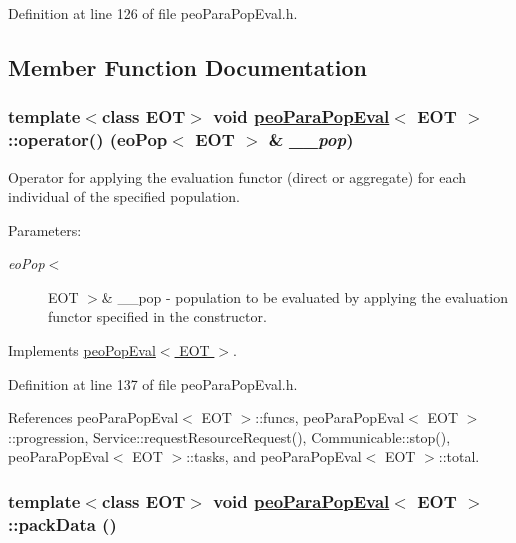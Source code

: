 Definition at line 126 of file peo\-Para\-Pop\-Eval.h.

\subsection{Member Function Documentation}
\hypertarget{classpeoParaPopEval_aeaa4fca4f8650e453e308838b4a2cb5}{
\subsubsection[operator()]{\setlength{\rightskip}{0pt plus 5cm}template$<$class EOT$>$ void \hyperlink{classpeoParaPopEval}{peo\-Para\-Pop\-Eval}$<$ EOT $>$::operator() (eo\-Pop$<$ EOT $>$ \& {\em \_\-\_\-pop})}}
\label{classpeoParaPopEval_aeaa4fca4f8650e453e308838b4a2cb5}


Operator for applying the evaluation functor (direct or aggregate) for each individual of the specified population. 

\begin{Desc}
\item[Parameters:]
\begin{description}
\item[{\em eo\-Pop$<$}]EOT $>$\& \_\-\_\-pop - population to be evaluated by applying the evaluation functor specified in the constructor. \end{description}
\end{Desc}


Implements \hyperlink{classpeoPopEval_2f208067a5e39c3b26c1234050a41e8f}{peo\-Pop\-Eval$<$ EOT $>$}.

Definition at line 137 of file peo\-Para\-Pop\-Eval.h.

References peo\-Para\-Pop\-Eval$<$ EOT $>$::funcs, peo\-Para\-Pop\-Eval$<$ EOT $>$::progression, Service::request\-Resource\-Request(), Communicable::stop(), peo\-Para\-Pop\-Eval$<$ EOT $>$::tasks, and peo\-Para\-Pop\-Eval$<$ EOT $>$::total.\hypertarget{classpeoParaPopEval_fea632bd645ab11182782fd3c038d6d8}{
\subsubsection[packData]{\setlength{\rightskip}{0pt plus 5cm}template$<$class EOT$>$ void \hyperlink{classpeoParaPopEval}{peo\-Para\-Pop\-Eval}$<$ EOT $>$::pack\-Data ()}}
\label{classpeoParaPopEval_fea632bd645ab11182782fd3c038d6d8}


